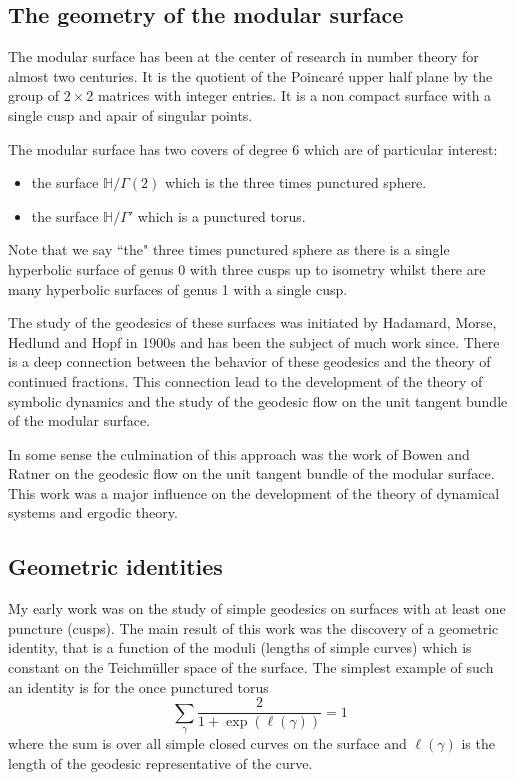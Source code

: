 \documentclass[12pt,a4paper]{amsart}
\begin{document}
\subsection{The geometry of the modular surface}

The modular surface has been at the center of research in number
theory for almost two centuries. It is the quotient of the Poincaré
upper half plane by the group of $2\times 2$ matrices with integer
entries. It is a non compact surface with a single cusp and apair of
singular points. 

The modular surface has two covers of degree 6 which are of particular interest:
\begin{itemize}
	\item the surface $\mathbb{H}/\Gamma(2)$ which is the 
		three times punctured sphere.
	\item the surface $\mathbb{H}/\Gamma'$ which is a
		punctured torus.
\end{itemize}

Note that we say ``the" three times punctured sphere as there is a
single hyperbolic surface of genus 0 with three cusps up to isometry
whilst there are many hyperbolic surfaces of genus 1 with a single
cusp.

The study of the geodesics of these surfaces was initiated by
Hadamard, Morse,
Hedlund and Hopf in 1900s and has been the subject of much work
since. There is a deep connection between the behavior of these
geodesics and the theory of continued fractions. This connection
lead to the development of the theory of symbolic dynamics and the study of the geodesic flow on the unit tangent bundle of the modular surface.

In some sense the culmination of this approach was the work of Bowen and Ratner on the geodesic flow on the unit tangent bundle of the modular surface. This work was a major influence on the development of the theory of dynamical systems and ergodic theory.

\subsection{Geometric identities}

My early work was on the study of simple geodesics on surfaces with
at least one puncture (cusps).
The main result of this work was the discovery of a
geometric identity, that is a function of the moduli (lengths of
simple curves) which is constant on the Teichmüller space of the
surface.
The simplest example of such an identity is for the once punctured torus
$$\sum_\gamma \frac{2}{1+ \exp(\ell(\gamma))} = 1$$
where the sum is over all simple closed curves on the surface and
$\ell(\gamma)$ is the length of the geodesic representative of the curve.
\end{document}
